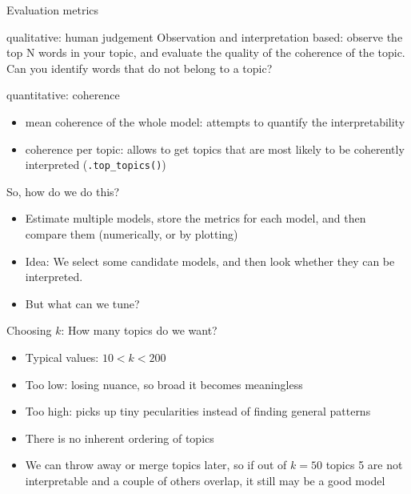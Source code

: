 \begin{frame}{Evaluation metrics}
	\begin{block}{qualitative: human judgement}
		Observation and interpretation based: observe the top N words in your topic, and evaluate the quality of the coherence of the topic.  Can you identify words that do not belong to a topic?
	\end{block}
	
	\pause 
	\begin{block}{quantitative: coherence}
		\begin{itemize}
			\item mean coherence of the whole model: attempts to quantify the interpretability
			\item coherence per topic: allows to get topics that are most likely to be coherently interpreted (\texttt{.top\_topics()})
		\end{itemize}
	\end{block}
	
\end{frame}


\begin{frame}{So, how do we do this?}
	\begin{itemize}[<+->]
		\item Estimate multiple models, store the metrics for each model, and then compare them (numerically, or by plotting)
		\item Idea: We select some candidate models, and then look whether they can be interpreted.
		\item But what can we tune?
	\end{itemize}
\end{frame}


\begin{frame}{Choosing $k$: How many topics do we want?}
	\begin{itemize}
		\item Typical values: $10<k<200$
		\item Too low: losing nuance, so broad it becomes meaningless
		\item Too high: picks up tiny pecularities instead of finding general patterns
		\item There is no inherent ordering of topics
		\item We can throw away or merge topics later, so if out of $k=50$ topics 5 are not interpretable and a couple of others overlap, it still may be a good model
	\end{itemize}
\end{frame}


